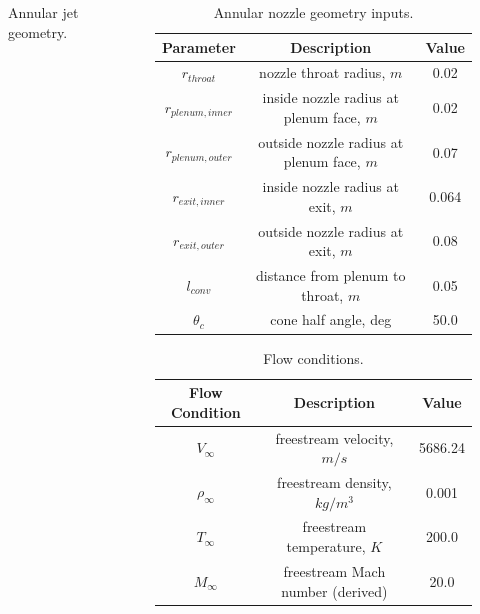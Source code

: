 \documentclass{beamer}
\begin{document}
\begin{frame}
\begin{columns}
\begin{column}{0.4\textwidth}
\begin{figure}
      \caption{Annular jet geometry.}
    \end{figure}
    \end{column}
    \begin{column}{0.65\textwidth}
      \tiny
    \begin{table}[h]
      \centering
      \begin{tabular}{c|c|c}
        Parameter & Description & Value \\
        \hline
        $r_{throat}$       &   nozzle throat radius, $m$                 & 0.02 \\
        $r_{plenum,inner}$ &   inside nozzle radius at plenum face, $m$  & 0.02 \\
        $r_{plenum,outer}$ &   outside nozzle radius at plenum face, $m$ & 0.07 \\
        $r_{exit,inner}$   &   inside nozzle radius at exit, $m$         & 0.064 \\
        $r_{exit,outer}$   &   outside nozzle radius at exit, $m$        & 0.08 \\
        $l_{conv}$         &   distance from plenum to throat, $m$       & 0.05 \\
        $\theta_c$         &   cone half angle, deg                      & 50.0
      \end{tabular}
      \caption{Annular nozzle geometry inputs.}
      \label{tab:annular-geom}
    \end{table}
    \begin{table}[!h]
      \centering
      \begin{tabular}{c|c|c}
        Flow Condition & Description & Value \\
        \hline
        $V_{\infty}$    & freestream velocity, $m/s$        & 5686.24 \\
        $\rho_{\infty}$ & freestream density, $kg/m^3$      & 0.001 \\
        $T_{\infty}$    & freestream temperature, $K$       & 200.0 \\
        $M_{\infty}$    & freestream Mach number (derived)  & 20.0
      \end{tabular}
      \caption{Flow conditions.}
      \label{tab:flow-conditions}
    \end{table}
    \end{column}
  \end{columns}
\end{frame}
\end{document}

